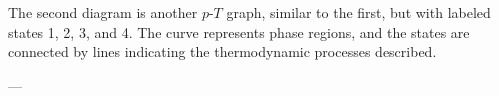 The second diagram is another \(p\)-\(T\) graph, similar to the first, but with labeled states 1, 2, 3, and 4. The curve represents phase regions, and the states are connected by lines indicating the thermodynamic processes described.

---